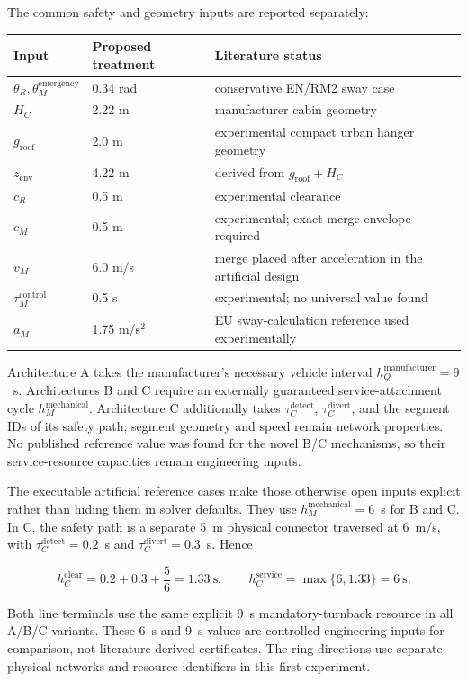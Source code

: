 \documentclass[11pt,a4paper]{scrartcl}
\begin{document}
The common safety and geometry inputs are reported separately:
\begin{center}
\small
\begin{tabular}{@{}lp{}p{}@{}}
\toprule
Input & Proposed treatment & Literature status \\
\midrule
$\theta_R,\theta_M^{\mathrm{emergency}}$ & 0.34 rad & conservative EN/RM2 sway case \\
$H_C$ & 2.22 m & manufacturer cabin geometry \\
$g_{\mathrm{roof}}$ & 2.0 m & experimental compact urban hanger geometry \\
$z_{\mathrm{env}}$ & 4.22 m & derived from $g_{\mathrm{roof}}+H_C$ \\
$c_R$ & 0.5 m & experimental clearance \\
$c_M$ & 0.5 m & experimental; exact merge envelope required \\
$v_M$ & 6.0 m/s & merge placed after acceleration in the artificial design \\
$\tau_M^{\mathrm{control}}$ & 0.5 s & experimental; no universal value found \\
$a_M$ & 1.75 m/s$^2$ & EU sway-calculation reference used experimentally \\
\bottomrule
\end{tabular}
\end{center}

Architecture A takes the manufacturer's necessary vehicle interval
$h_Q^{\mathrm{manufacturer}}=9$~s.  Architectures B and C require an externally
guaranteed service-attachment cycle $h_M^{\mathrm{mechanical}}$.  Architecture C
additionally takes $\tau_C^{\mathrm{detect}}$, $\tau_C^{\mathrm{divert}}$, and
the segment IDs of its safety path; segment geometry and speed remain network
properties.  No published reference value was found for the novel B/C
mechanisms, so their service-resource capacities remain engineering inputs.

The executable artificial reference cases make those otherwise open inputs
explicit rather than hiding them in solver defaults.  They use
$h_M^{\mathrm{mechanical}}=6$~s for B and C.  In C, the safety path is a
separate 5~m physical connector traversed at 6~m/s, with
$\tau_C^{\mathrm{detect}}=0.2$~s and
$\tau_C^{\mathrm{divert}}=0.3$~s.  Hence

\[
h_C^{\mathrm{clear}}=0.2+0.3+\frac{5}{6}=1.33\ \mathrm{s},
\qquad
h_C^{\mathrm{service}}=\max\{6,1.33\}=6\ \mathrm{s}.
\]

Both line terminals use the same explicit 9~s mandatory-turnback resource in
all A/B/C variants.  These 6~s and 9~s values are controlled engineering inputs
for comparison, not literature-derived certificates.  The ring directions use
separate physical networks and resource identifiers in this first experiment.
\end{document}
